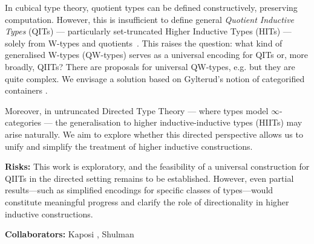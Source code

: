 \documentclass[a4paper,11pt]{article}
\renewcommand{\paragraph}[1]{\textbf{#1.}}
\begin{document}
In cubical type theory, quotient types can be defined constructively,
preserving computation. However, this is insufficient to define
general \emph{Quotient Inductive Types} (QITs) — particularly
set-truncated Higher Inductive Types (HITs) — solely from W-types and
quotients~\cite{lumsdaine2020semantics}. This raises the question: what
kind of generalised W-types (QW-types) serves as a universal encoding
for QITs or, more broadly, QIITs? There are proposals for
universal QW-types,
e.g. \cite{fiore2022quotients,kaposi2019constructing} but they are
quite complex. We envisage a solution based on Gylterud's notion of
categorified containers \cite{gylterud2011symmetric,altenkirch2024qits}. 



Moreover, in untruncated Directed Type Theory — where types model
$\infty$-categories — the generalisation to higher inductive-inductive
types (HIITs) may arise naturally. We aim to explore whether this
directed perspective allows us to unify and simplify the treatment of
higher inductive constructions.

\textbf{Risks:} This work is exploratory, and the feasibility of a
universal construction for QIITs in the directed setting remains to be
established. However, even partial results—such as simplified
encodings for specific classes of types—would constitute meaningful
progress and clarify the role of directionality in higher inductive
constructions.

\textbf{Collaborators:} Kaposi , Shulman

\end{document}
